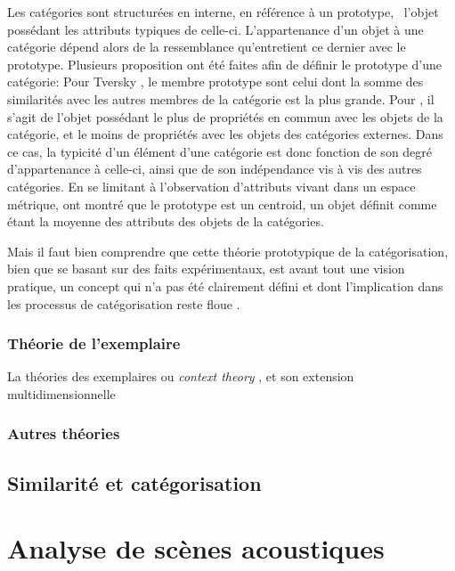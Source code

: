Les catégories sont structurées en interne, en référence à un prototype, \ie~l'objet possédant les attributs typiques de celle-ci. L'appartenance d'un objet à une catégorie dépend alors de la ressemblance qu'entretient ce dernier avec le prototype.  Plusieurs proposition ont été faites afin de définir le prototype d'une catégorie: Pour Tversky \citep{tversky1977features}, le membre prototype sont celui dont la somme des similarités avec les autres membres de la catégorie est la plus grande. Pour \citep{rosch1975family}, il s'agit de l'objet possédant le plus de propriétés en commun avec les objets de la catégorie, et le moins de propriétés avec les objets des catégories externes. Dans ce cas, la typicité d'un élément d'une catégorie est donc fonction de son degré d'appartenance à celle-ci, ainsi que de son indépendance vis à vis des autres catégories. En se limitant à l'observation d'attributs vivant dans un espace métrique, \citep{reed1972pattern, rosch1976structural} ont montré que le prototype est un centroid, un objet définit comme étant la moyenne des attributs des objets de la catégories.

Mais il faut bien comprendre que cette théorie prototypique de la catégorisation, bien que se basant sur des faits expérimentaux, est avant tout une vision pratique, un concept qui n'a pas été clairement défini et dont l'implication dans les processus de catégorisation reste floue \citep[p. 36-40]{rosch1978cognition} \citep[p. 49-54]{dubois1991semantique}.

\subsubsection{Théorie de l'exemplaire}

La théories des exemplaires ou \textit{context theory} \citep{medin1978context}, et son extension multidimensionnelle \citep{medin1978context}

\subsubsection{Autres théories}

\subsection{Similarité et catégorisation}

\section{Analyse de scènes acoustiques}
\label{sec:ASA}

